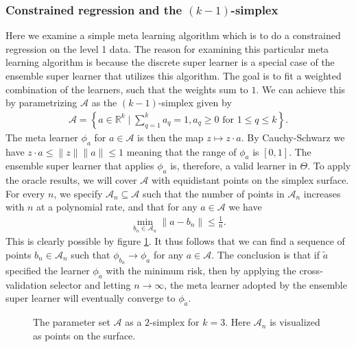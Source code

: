 \documentclass[11pt, a4paper]{article}
\newcommand\norm[1]{\lVert#1\rVert}
\theoremstyle{definition}
\theoremstyle{remark}
\newcommand{\q}{q}
\newcommand{\ml}{k}
\newcommand{\meta}{\phi}
\begin{document}
\subsubsection{Constrained regression and the $ (\ml-1) $-simplex} 
Here we examine a simple meta learning algorithm which is to do a constrained regression on the level 1 data. The reason for examining this particular meta learning algorithm is because the discrete super learner is a special case of the ensemble super learner that utilizes this algorithm. The goal is to fit a weighted combination of the learners, such that the weights sum to $ 1 $. We can achieve this by parametrizing $ \mathcal{A} $ as the $ (\ml -1) $-simplex given by
\begin{align*}
    \mathcal{A} = \left\{ a \in \mathbb{R}^{\ml} \mid \sum_{\q = 1}^{\ml} a_\q = 1 , a_\q \geq 0 \text{ for } 1 \leq \q \leq k \right\}. 
\end{align*}
The meta learner $ \meta_{a} $ for $ a \in \mathcal{A} $ is then the map $ z \mapsto z \cdot a $. By Cauchy-Schwarz we have $ z \cdot a \leq \norm{z} \norm{a} \leq 1 $ meaning that the range of $ \meta_a $ is $ [0,1] $. The ensemble super learner that applies $ \meta_a $ is, therefore, a valid learner in $ \Theta $. To apply the oracle results, we will cover $ \mathcal{A} $ with equidistant points on the simplex surface. For every $ n $, we specify $ \mathcal{A}_n \subseteq \mathcal{A} $ such that the number of points in $ \mathcal{A}_n $ increases with $ n $ at a polynomial rate, and that for any $ a \in \mathcal{A} $ we have 
\begin{align*}
    \min_{b_n \in \mathcal{A}_n } \norm{a - b_n} \leq \frac{1}{n}.
\end{align*}
This is clearly possible by figure \ref{fig:simplex}. It thus follows that we can find a sequence of points $ b_n \in \mathcal{A}_n $ such that $ \meta_{b_n} \to \meta_{a} $ for any $ a \in \mathcal{A}$. The conclusion is that if $ \tilde{a} $ specified the learner $ \meta_{ \tilde{a} } $ with the minimum risk, then by applying the cross-validation selector and letting $ n \to \infty $, the meta learner adopted by the ensemble super learner will eventually converge to $ \meta_{ \tilde{a} } $. 

\begin{figure}[H]
    \centering
    
    \caption{The parameter set $ \mathcal{A} $ as a $ 2 $-simplex for $ \ml = 3 $. Here $ \mathcal{A}_n $ is visualized as points on the surface.}
    \label{fig:simplex}
\end{figure}
\end{document}
